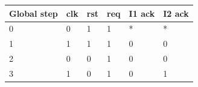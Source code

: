 \begin{tabular}{llllll}
\toprule
Global step & clk & rst & req & I1 ack & I2 ack \\
\midrule
0 & 0 & 1 & 1 & * & * \\
1 & 1 & 1 & 1 & 0 & 0 \\
2 & 0 & 0 & 1 & 0 & 0 \\
3 & 1 & 0 & 1 & 0 & 1 \\
\bottomrule
\end{tabular}
